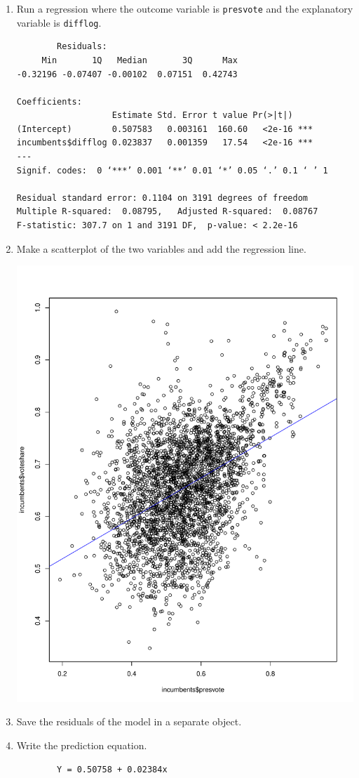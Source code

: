 \documentclass[12pt,letterpaper]{article}
\begin{document}
	\begin{enumerate}
		\item Run a regression where the outcome variable is \texttt{presvote} and the explanatory variable is \texttt{difflog}.
		 
		\begin{verbatim}
		Residuals:
     Min       1Q   Median       3Q      Max 
-0.32196 -0.07407 -0.00102  0.07151  0.42743 

Coefficients:
                   Estimate Std. Error t value Pr(>|t|)    
(Intercept)        0.507583   0.003161  160.60   <2e-16 ***
incumbents$difflog 0.023837   0.001359   17.54   <2e-16 ***
---
Signif. codes:  0 ‘***’ 0.001 ‘**’ 0.01 ‘*’ 0.05 ‘.’ 0.1 ‘ ’ 1

Residual standard error: 0.1104 on 3191 degrees of freedom
Multiple R-squared:  0.08795,	Adjusted R-squared:  0.08767 
F-statistic: 307.7 on 1 and 3191 DF,  p-value: < 2.2e-16
		\end{verbatim}
		
		
		\item Make a scatterplot of the two variables and add the regression line. 
		 
		\includegraphics[width=.75\textwidth]{plot_2.pdf} 
		
		\item Save the residuals of the model in a separate object.	
		
		
		\item Write the prediction equation.
		\begin{verbatim}
		Y = 0.50758 + 0.02384x
		\end{verbatim}
		
	\end{enumerate}
	
\end{document}
